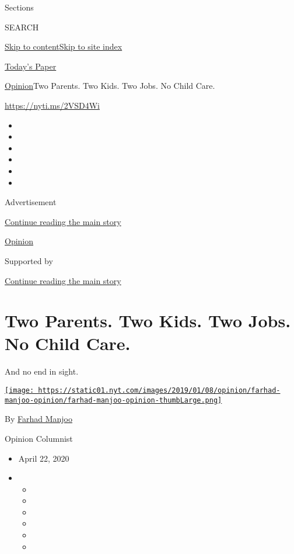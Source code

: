 Sections

SEARCH

\protect\hyperlink{site-content}{Skip to
content}\protect\hyperlink{site-index}{Skip to site index}

\href{https://myaccount.nytimes.com/auth/login?response_type=cookie\&client_id=vi}{}

\href{https://www.nytimes.com/section/todayspaper}{Today's Paper}

\href{/section/opinion}{Opinion}\textbar{}Two Parents. Two Kids. Two
Jobs. No Child Care.

\href{https://nyti.ms/2VSD4Wi}{https://nyti.ms/2VSD4Wi}

\begin{itemize}
\item
\item
\item
\item
\item
\item
\end{itemize}

Advertisement

\protect\hyperlink{after-top}{Continue reading the main story}

\href{/section/opinion}{Opinion}

Supported by

\protect\hyperlink{after-sponsor}{Continue reading the main story}

\hypertarget{two-parents-two-kids-two-jobs-no-child-care}{%
\section{Two Parents. Two Kids. Two Jobs. No Child
Care.}\label{two-parents-two-kids-two-jobs-no-child-care}}

And no end in sight.

\href{https://www.nytimes.com/by/farhad-manjoo}{\texttt{[image: https://static01.nyt.com/images/2019/01/08/opinion/farhad-manjoo-opinion/farhad-manjoo-opinion-thumbLarge.png]}}

By \href{https://www.nytimes.com/by/farhad-manjoo}{Farhad Manjoo}

Opinion Columnist

\begin{itemize}
\item
  April 22, 2020
\item
  \begin{itemize}
  \item
  \item
  \item
  \item
  \item
  \item
  \end{itemize}
\end{itemize}

